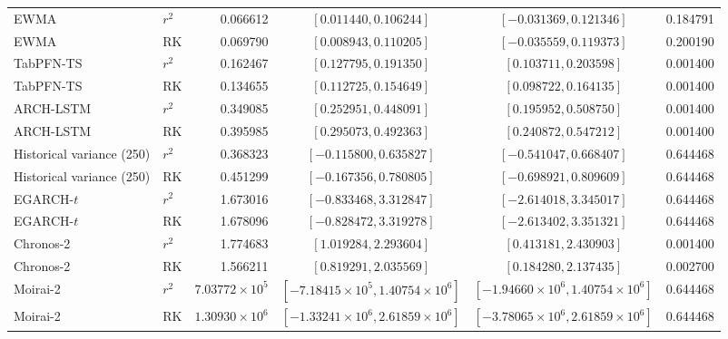\begin{longtable}{@{}>{\raggedright\arraybackslash}p{2.0cm}lrccr@{}}
EWMA & $r^2$ & 0.066612 & $[0.011440,0.106244]$ & $[-0.031369,0.121346]$ & 0.184791 \\
EWMA & RK & 0.069790 & $[0.008943,0.110205]$ & $[-0.035559,0.119373]$ & 0.200190 \\
TabPFN-TS & $r^2$ & 0.162467 & $[0.127795,0.191350]$ & $[0.103711,0.203598]$ & 0.001400 \\
TabPFN-TS & RK & 0.134655 & $[0.112725,0.154649]$ & $[0.098722,0.164135]$ & 0.001400 \\
ARCH-LSTM & $r^2$ & 0.349085 & $[0.252951,0.448091]$ & $[0.195952,0.508750]$ & 0.001400 \\
ARCH-LSTM & RK & 0.395985 & $[0.295073,0.492363]$ & $[0.240872,0.547212]$ & 0.001400 \\
Historical variance (250) & $r^2$ & 0.368323 & $[-0.115800,0.635827]$ & $[-0.541047,0.668407]$ & 0.644468 \\
Historical variance (250) & RK & 0.451299 & $[-0.167356,0.780805]$ & $[-0.698921,0.809609]$ & 0.644468 \\
EGARCH-$t$ & $r^2$ & 1.673016 & $[-0.833468,3.312847]$ & $[-2.614018,3.345017]$ & 0.644468 \\
EGARCH-$t$ & RK & 1.678096 & $[-0.828472,3.319278]$ & $[-2.613402,3.351321]$ & 0.644468 \\
Chronos-2 & $r^2$ & 1.774683 & $[1.019284,2.293604]$ & $[0.413181,2.430903]$ & 0.001400 \\
Chronos-2 & RK & 1.566211 & $[0.819291,2.035569]$ & $[0.184280,2.137435]$ & 0.002700 \\
Moirai-2 & $r^2$ & $7.03772\times10^{5}$ & $[-7.18415\times10^{5},1.40754\times10^{6}]$ & $[-1.94660\times10^{6},1.40754\times10^{6}]$ & 0.644468 \\
Moirai-2 & RK & $1.30930\times10^{6}$ & $[-1.33241\times10^{6},2.61859\times10^{6}]$ & $[-3.78065\times10^{6},2.61859\times10^{6}]$ & 0.644468 \\
\bottomrule
\end{longtable}\endgroup
